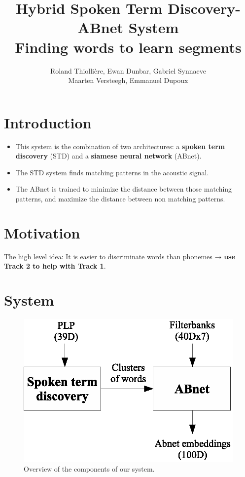 \documentclass[final]{beamer}
\title
[Interspeech (2015, Dresden, Germany)] %
{ %
Hybrid Spoken Term Discovery-ABnet System\\
Finding words to learn segments
}
\author{ %
Roland Thiolli\`ere\inst{*}, Ewan Dunbar\inst{*}, Gabriel Synnaeve\inst{*\dagger}\\Maarten Versteegh\inst{*}, Emmanuel Dupoux\inst{*}
}
\institute
[ENS] %
{
\inst{*} LSCP, \'{E}cole Normale Sup\'{e}rieure / EHESS / CNRS, Paris, France\\%
\inst{\dagger} now at Facebook AI Research\\[0.5ex]
\inst{} \begin{small}\texttt{rolthiolliere@gmail.com, emd@umd.edu, gabrielsynnaeve@gmail.com, maartenversteegh@gmail.com, emmanuel.dupoux@gmail.com}\end{small}
}
\newcommand{\abnet}{{\sc ABnet}}
\begin{document}
\begin{frame}[t]
\begin{multicols}{2} %

\section{Introduction}

\begin{itemize}
\item This system is the combination of two architectures: a \textbf{spoken term discovery}\cite{jansenvandurme2011} (STD) and a \textbf{siamese neural network}\cite{synnaevedupoux2014} (\abnet{}).
\item The STD system finds matching patterns in the acoustic signal.
\item The \abnet{} is trained to minimize the distance between those matching patterns, and maximize the distance between non matching patterns.
\end{itemize}



\section{Motivation}

The high level idea: It is easier to discriminate words than phonemes → \textbf{use Track 2 to help with Track 1}.


\section{System}

\begin{figure}[ht!]
  \begin{center}
    \includegraphics[width=0.7\columnwidth]{system_overview2}
    \caption{\label{fig:system}Overview of the components of our system.}
  \end{center}
\end{figure}


\end{multicols}
\end{frame}
\end{document}
